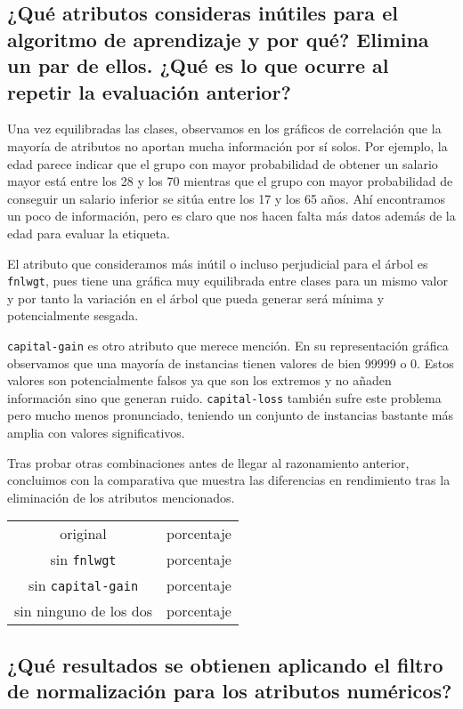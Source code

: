 \documentclass[12pt]{article}
\begin{document}
\subsection*{\small ¿Qué atributos consideras inútiles para el algoritmo de aprendizaje y por qué? Elimina un par de ellos. ¿Qué es lo que ocurre al repetir la evaluación anterior?}

Una vez equilibradas las clases, observamos en los gráficos de correlación que la mayoría de atributos no aportan mucha información por sí solos. Por ejemplo, la edad parece indicar que el grupo con mayor probabilidad de obtener un salario mayor está entre los 28 y los 70 mientras que el grupo con mayor probabilidad de conseguir un salario inferior se sitúa entre los 17 y los 65 años. Ahí encontramos un poco de información, pero es claro que nos hacen falta más datos además de la edad para evaluar la etiqueta.

El atributo que consideramos más inútil o incluso perjudicial para el árbol es \texttt{fnlwgt}, pues tiene una gráfica muy equilibrada entre clases para un mismo valor y por tanto la variación en el árbol que pueda generar será mínima y potencialmente sesgada.

\texttt{capital-gain} es otro atributo que merece mención. En su representación gráfica observamos que una mayoría de instancias tienen valores de bien 99999 o 0. Estos valores son potencialmente falsos ya que son los extremos y no añaden información sino que generan ruido. \texttt{capital-loss} también sufre este problema pero mucho menos pronunciado, teniendo un conjunto de instancias bastante más amplia con valores significativos.

Tras probar otras combinaciones antes de llegar al razonamiento anterior, concluimos con la comparativa que muestra las diferencias en rendimiento tras la eliminación de los atributos mencionados.\\
\begin{tabular}{cl}
    original & porcentaje\\
    sin \texttt{fnlwgt} & porcentaje\\
    sin \texttt{capital-gain} & porcentaje\\
    sin ninguno de los dos & porcentaje\\
\end{tabular}

\subsection*{\small ¿Qué resultados se obtienen aplicando el filtro de normalización para los atributos numéricos?}
\end{document}
